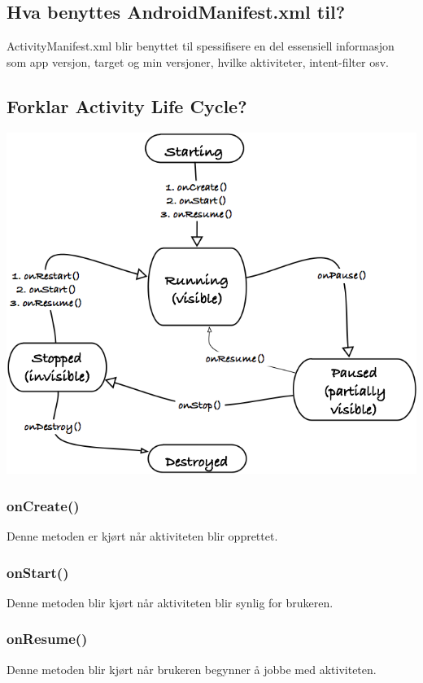 \documentclass[a4paper, 12pt]{article}
\begin{document}
\subsection*{Hva benyttes AndroidManifest.xml til?}
ActivityManifest.xml blir benyttet til spessifisere en del essensiell informasjon som app versjon, target og min versjoner, hvilke aktiviteter, intent-filter osv.

\subsection*{Forklar Activity Life Cycle?}
\includegraphics*[scale=0.5]{ActivityLifecycle.png}

\subsubsection*{onCreate()}
Denne metoden er kjørt når aktiviteten blir opprettet.

\subsubsection*{onStart()}
Denne metoden blir kjørt når aktiviteten blir synlig for brukeren.

\subsubsection*{onResume()}
Denne metoden blir kjørt når brukeren begynner å jobbe med aktiviteten.
\end{document}
